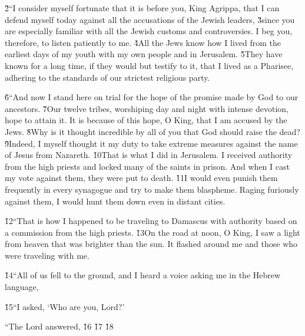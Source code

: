 \v{2}``I consider myself fortunate that it is before you, King Agrippa, that I can defend myself today against all the accusations of the Jewish leaders, \v{3}since you are especially familiar with all the Jewish customs and controversies. I beg you, therefore, to listen patiently to me. \v{4}All the Jews know how I lived from the earliest days of my youth with my own people and in Jerusalem. \v{5}They have known for a long time, if they would but testify to it, that I lived as a Pharisee, adhering to the standards of our strictest religious party.

\v{6}``And now I stand here on trial for the hope of the promise made by God to our ancestors. \v{7}Our twelve tribes, worshiping day and night with intense devotion, hope to attain it. It is because of this hope, O King, that I am accused by the Jews. \v{8}Why is it thought incredible by all of you that God should raise the dead? \v{9}Indeed, I myself thought it my duty to take extreme measures against the name of Jesus from Nazareth. \v{10}That is what I did in Jerusalem. I received authority from the high priests and locked many of the saints in prison. And when I cast my vote against them, they were put to death. \v{11}I would even punish them frequently in every synagogue and try to make them blaspheme. Raging furiously against them, I would hunt them down even in distant cities.

\v{12}``That is how I happened to be traveling to Damascus with authority based on a commission from the high priests. \v{13}On the road at noon, O King, I saw a light from heaven that was brighter than the sun. It flashed around me and those who were traveling with me.

\v{14}``All of us fell to the ground, and I heard a voice asking me in the Hebrew language, 

\v{15}``I asked, `Who are you, Lord?'

``The Lord answered,  \v{16} \v{17} \v{18}

